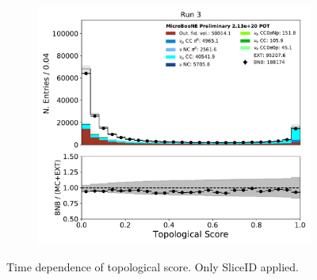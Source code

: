 \begin{figure}[hbt!]
\begin{center}
\begin{subfigure}[b]{0.35\textwidth}
    \end{subfigure}
    \begin{subfigure}[b]{0.35\textwidth}
        \centering
        \includegraphics[width=1.00\textwidth]{NuMuCCsel/Images/Ryan/Run3_nocrt/topological_score_08062020_samples_longest_noCRT_event_category.pdf}
    \end{subfigure} %
\caption{Time dependence of topological score. Only SliceID applied.}
\label{fig:NuMuCCsel:timedep:topo}
\end{center}
\end{figure}


